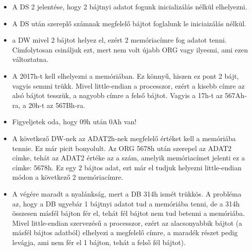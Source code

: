 \begin{itemize}
  \item A DS 2 jelentése, hogy 2 bájtnyi adatot fogunk inicializálás nélkül elhelyezni.
  \item \colorbox{orange!30}{A DS után szereplő számnak megfelelő bájtot foglalunk le iniciaizálás nélkül.}
  \item a DW mivel 2 bájtot helyez el, ezért 2 memóriacímre fog adatot tenni. Címfolytosan csináljuk ezt, mert nem volt újabb ORG vagy ilyesmi, ami ezen változtatna.
  \item A 2017h-t kell elhelyezni a memóriában. Ez könnyű, hiszen ez pont 2 bájt, vagyis semmi trükk. Mivel little-endian a processzor, ezért a kisebb címre az alsó bájtot tesszük, a nagyobb címre a felső bájtot. Vagyis a 17h-t az 567Ah-ra, a 20h-t az 567Bh-ra.
  \item \colorbox{orange!30}{Figyeljetek oda, hogy 09h után 0Ah van!}
  \item A következő DW-nek az ADAT2h-nek megfelelő értéket kell a memóriába tennie. Ez már picit bonyolult. Az ORG 5678h után szerepel az ADAT2 címke, tehát az ADAT2 értéke az a szám, amelyik memóriacímet jelenti ez a címke: 5678h. Ez egy 2 bájtos adat, ezt már el tudjuk helyezni little-endian módon a következő 2 memóriacímre.
  \item A végére maradt a nyalánkság, mert a DB 314h ismét trükkös. A probléma az, hogy a DB ugyebár 1 bájtnyi adatot tud a memóriába tenni, de a 314h összesen másfél bájton fér el, tehát fél bájtot nem tud betenni a memóriába. Mivel little-endian szervezésű a processzor, ezért az alacsonyabbik bájtot (a másfél bájtos adatból) elhelyezi a megfelelő címre, a maradék részet pedig levágja, ami nem fér el 1 bájton, tehát a felső fél bájtot).
\end{itemize}
